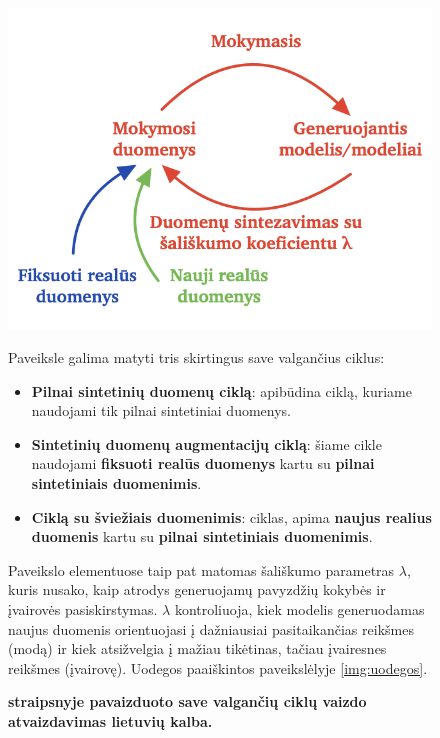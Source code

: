 \documentclass{VUMIFInfKursinis}
\begin{document}
\begin{figure}[H]
    \centering
    \includegraphics[scale=0.7]{img/valgantysCiklai.png}
    \caption{
        \textbf{\cite{ModelsGoMAD} straipsnyje pavaizduoto save valgančių ciklų vaizdo atvaizdavimas lietuvių kalba.}
    }
    \label{img:ciklai}
    Paveiksle galima matyti tris skirtingus save valgančius ciklus:
    \begin{itemize}
        \item \textbf{\textcolor{raudona}{Pilnai sintetinių duomenų ciklą}}: apibūdina ciklą, kuriame naudojami tik pilnai sintetiniai duomenys.
        \item \textbf{Sintetinių duomenų augmentacijų ciklą}: šiame cikle naudojami \textbf{\textcolor{melyna}{fiksuoti realūs duomenys}} kartu su \textbf{\textcolor{raudona}{pilnai sintetiniais duomenimis}}.
        \item \textbf{Ciklą su šviežiais duomenimis}: ciklas, apima \textbf{\textcolor{zalia}{naujus realius duomenis}} kartu su \textbf{\textcolor{raudona}{pilnai sintetiniais duomenimis}}.
    \end{itemize}

    Paveikslo elementuose taip pat matomas šališkumo parametras \textbf{\textcolor{raudona}{\(\lambda\)}}, kuris nusako, kaip atrodys generuojamų pavyzdžių kokybės ir įvairovės pasiskirstymas. \textbf{\textcolor{raudona}{\( \lambda \)}} kontroliuoja, kiek modelis generuodamas naujus duomenis orientuojasi į dažniausiai pasitaikančias reikšmes (modą) ir kiek atsižvelgia į mažiau tikėtinas, tačiau įvairesnes reikšmes (įvairovę). Uodegos paaiškintos paveikslėlyje \ref{img:uodegos}.


\end{figure}
\end{document}
